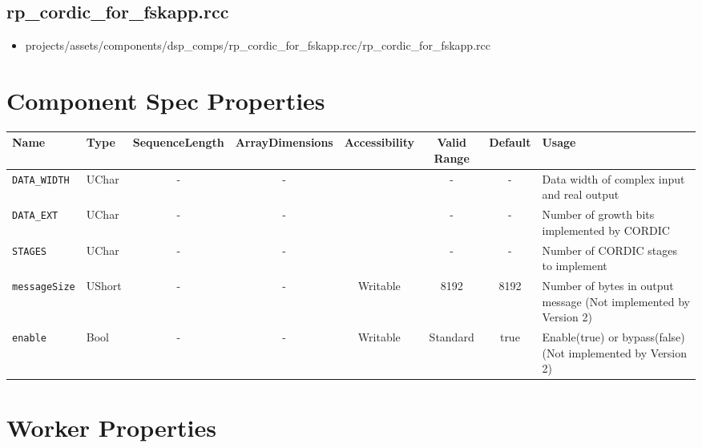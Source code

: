 \documentclass{article}
\def\rcc_comp{rp\_cordic\_for\_fskapp}
\begin{document}
\subsection*{\rcc_comp.rcc}
\begin{itemize}
	\item projects/assets/components/dsp\_comps/\rcc_comp.rcc/\rcc_comp.rcc
\end{itemize}

\begin{landscape}
\section*{Component Spec Properties}
	\begin{scriptsize}
		\begin{longtable}{|p{3cm}|p{1.5cm}|c|c|c|c|c|p{7cm}|}
			\hline
			\rowcolor{blue}
			Name               & Type   & SequenceLength & ArrayDimensions & Accessibility      & Valid Range & Default & Usage                                        \\
			\hline
			\verb+DATA_WIDTH+  & UChar  & -              & -               & & -           & -       & Data width of complex input and real output \\
			\hline
			\verb+DATA_EXT+    & UChar  & -              & -               & & -           & -       & Number of growth bits implemented by CORDIC  \\
			\hline
			\verb+STAGES+      & UChar  & -              & -               & & -           & -       & Number of CORDIC stages to implement          \\
			\hline
			\verb+messageSize+ & UShort & -              & -               & Writable & 8192        & 8192    & Number of bytes in output message (Not implemented by Version 2) \\
			\hline
			\verb+enable+      & Bool   & -              & -               & Writable & Standard    & true    & Enable(true) or bypass(false)                                      (Not implemented by Version 2) \\
			\hline
		\end{longtable}
	\end{scriptsize}

	\section*{Worker Properties}

\end{landscape}
\end{document}
